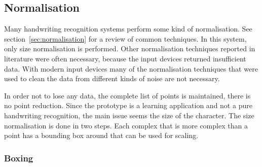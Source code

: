 \subsection{Normalisation}
\label{sec:hwre:normalisation}

Many handwriting recognition systems perform some kind of normalisation.
See section~\ref{sec:normalisation} for a review of common techniques.
In this system, only size normalisation is performed. Other normalisation 
techniques reported in literature were often necessary, because the input 
devices returned insufficient data. With modern input devices many of the 
normalisation techniques that were used to clean the data from different
kinds of noise are not necessary.

In order not to lose any data, the complete list of points is maintained,
there is no point reduction. Since the prototype is a learning application and 
not a pure handwriting recognition, the main issue seems the size of the 
character. The size normalisation is done in two steps. Each complex that
is more complex than a point has a bounding box around that can be used for 
scaling.

\subsubsection{Boxing}
\label{sec:hwre:boxing}

